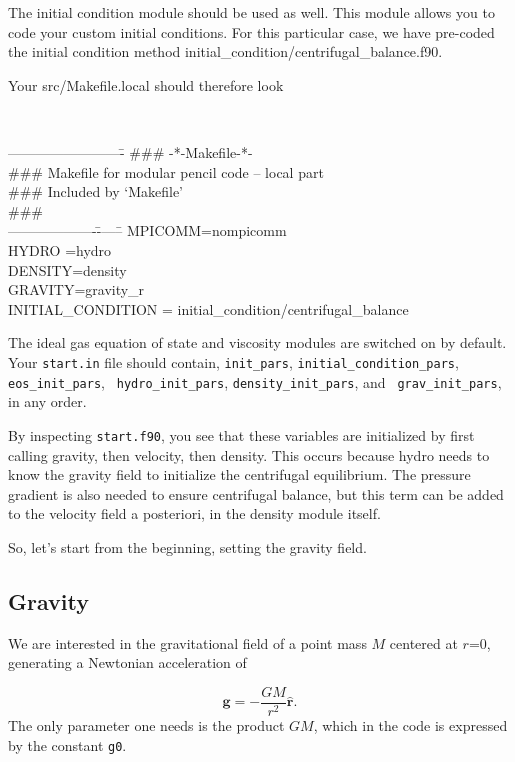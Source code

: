 \documentclass[a4paper,10pt]{article}
\renewcommand{\v}[1]{{\boldsymbol #1}} %
\newcommand{\hatr}{\hat{\v{r}}}
\begin{document}
The initial condition module should be used as well. This module allows you to code your
custom initial conditions. For this particular case, we have pre-coded
the initial condition method initial\_condition/centrifugal\_balance.f90. 

Your src/Makefile.local should therefore look


{\tt 
\begin{tabbing}
-------------------------\=\kill
\#\#\#  \>  -*-Makefile-*-\\
\#\#\# Makefile for modular pencil code -- local part\\
\#\#\# Included by `Makefile'\\
\#\#\#\\
-------------------\=------\=\kill
MPICOMM\>=\>nompicomm\\
HYDRO  \>=\>hydro\\
DENSITY\>=\>density\\
GRAVITY\>=\>gravity\_r\\
INITIAL\_CONDITION\> = \>initial\_condition/centrifugal\_balance
\end{tabbing}
}

The ideal gas equation of state and viscosity modules are switched on
by default. Your {\tt start.in} file should contain, {\tt init\_pars},
{\tt initial\_condition\_pars}, {\tt eos\_init\_pars}, {\tt
  hydro\_init\_pars},  {\tt density\_init\_pars}, and {\tt
  grav\_init\_pars}, in any order.

By inspecting {\tt start.f90}, you see that these variables are initialized by first calling gravity, then velocity, then density. This occurs because hydro needs to know the gravity field to initialize the centrifugal equilibrium. The pressure gradient is also needed to ensure centrifugal balance, but this term can be added to the velocity field a posteriori, in the density module itself. 

So, let's start from the beginning, setting the gravity field.

\subsection{Gravity}

We are interested in the gravitational field of a point mass $M$ centered at $r$=$0$, generating a Newtonian acceleration of  

\begin{equation}
\v{g} = -\frac{GM}{r^2} \hatr .
\end{equation}The only parameter one needs is the product $GM$, which in the code is expressed by the constant {\tt g0}. 
\end{document}
